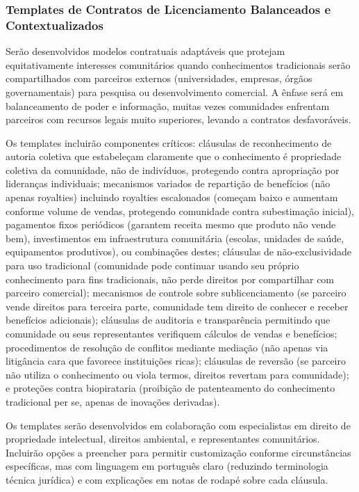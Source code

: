 \subsubsection{Templates de Contratos de Licenciamento Balanceados e Contextualizados}

Serão desenvolvidos modelos contratuais adaptáveis que protejam equitativamente interesses comunitários quando conhecimentos tradicionais serão compartilhados com parceiros externos (universidades, empresas, órgãos governamentais) para pesquisa ou desenvolvimento comercial. A ênfase será em balanceamento de poder e informação, muitas vezes comunidades enfrentam parceiros com recursos legais muito superiores, levando a contratos desfavoráveis.

Os templates incluirão componentes críticos: cláusulas de reconhecimento de autoria coletiva que estabeleçam claramente que o conhecimento é propriedade coletiva da comunidade, não de indivíduos, protegendo contra apropriação por lideranças individuais; mecanismos variados de repartição de benefícios (não apenas royalties) incluindo royalties escalonados (começam baixo e aumentam conforme volume de vendas, protegendo comunidade contra subestimação inicial), pagamentos fixos periódicos (garantem receita mesmo que produto não vende bem), investimentos em infraestrutura comunitária (escolas, unidades de saúde, equipamentos produtivos), ou combinações destes; cláusulas de não-exclusividade para uso tradicional (comunidade pode continuar usando seu próprio conhecimento para fins tradicionais, não perde direitos por compartilhar com parceiro comercial); mecanismos de controle sobre sublicenciamento (se parceiro vende direitos para terceira parte, comunidade tem direito de conhecer e receber benefícios adicionais); cláusulas de auditoria e transparência permitindo que comunidade ou seus representantes verifiquem cálculos de vendas e benefícios; procedimentos de resolução de conflitos mediante mediação (não apenas via litigância cara que favorece instituições ricas); cláusulas de reversão (se parceiro não utiliza o conhecimento ou viola termos, direitos revertam para comunidade); e proteções contra biopirataria (proibição de patenteamento do conhecimento tradicional per se, apenas de inovações derivadas).

Os templates serão desenvolvidos em colaboração com especialistas em direito de propriedade intelectual, direitos ambiental, e representantes comunitários. Incluirão opções a preencher para permitir customização conforme circunstâncias específicas, mas com linguagem em português claro (reduzindo terminologia técnica jurídica) e com explicações em notas de rodapé sobre cada cláusula.

